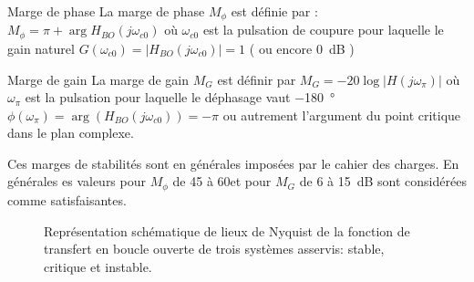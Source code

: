 \begin{definition}{Marge de phase}
La marge de phase $M_{\phi}$ est définie par :
$M_\phi=\pi+\arg{H_{BO}(j\omega_{c0})}$ où $\omega_{c0}$ est la pulsation de 
coupure pour laquelle le gain naturel $G(\omega_{c0})=|H_{BO}(j\omega_{c0})|=1$
( ou encore 0~\si{\dB} ) 
\end{definition}

\begin{definition}{Marge de gain}
La marge de gain $M_G$ est définir par $M_G=-20\log{|H(j\omega_\pi)|}$ où 
$\omega_{\pi}$ est la pulsation pour laquelle le déphasage vaut 
\SI{-180}{\degree} $\phi(\omega_\pi)=\arg{(H_{BO}(j\omega_{c0}))}=-\pi$
ou autrement l'argument du point critique dans le plan complexe.
\end{definition}

Ces marges de stabilités sont en générales imposées par le cahier des charges.
En générales es valeurs pour $M_{\phi}$ de 45 à 60\degree et
pour $M_G$ de 6 à 15~\si{\dB} sont considérées comme satisfaisantes.


\begin{figure}[!h]
    \centering
    
    \caption{Représentation schématique de lieux de Nyquist de la fonction 
             de transfert en boucle ouverte de trois systèmes asservis: 
             stable, critique et instable. \label{fig-nyquist_revers}}
\end{figure}

